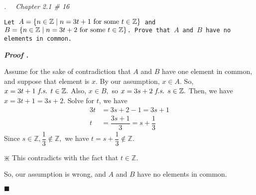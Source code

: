 \documentclass[11pt,letter]{article}
\newcounter{nq}[section]
\newcounter{np}[section]
\newenvironment*{p}{\par\noindent\textbf{\textit{Proof \stepcounter{np}\thenp. }}\par}{\par\hfill $\blacksquare$\par}
\newenvironment*{q}[1]{\noindent\emph{\thesection.\stepcounter{nq}\thenq$\quad $ #1}\par\noindent\texttt}{}
\def\Z{{\mathbb{Z}}}
\def\fs{\emph{ f.s. }}
\begin{document}
\begin{framed}\begin{q}
	{Chapter 2.1 \# 16}
	{Let $A=\qty{n\in\Z\mid n=3t+1\text{ for some }t\in\Z}$ and $B=\qty{n\in\Z\mid n=3t+2\text{ for some }t\in\Z}$. Prove that $A$ and $B$ have no elements in common.}
\end{q}\end{framed}
\begin{p}
	Assume for the sake of contradiction that $A$ and $B$ have one element in common, and suppose that element is $x$. By our assumption, $x\in A.$ So, $x=3t+1\fs t\in\Z.$ Also, $x\in B,$ so $x=3s+2\fs s\in\Z.$ Then, we have $x=3t+1=3s+2.$ Solve for $t$, we have \[\begin{aligned}3t&=3s+2-1=3s+1\\t&=\dfrac{3s+1}{3}=s+\dfrac{1}{3}\end{aligned}\] Since $s\in\Z,\dfrac{1}{3}\notin\Z,$ we have $t=s+\dfrac{1}{3}\notin\Z.$ \begin{center}$\divideontimes$ This contradicts with the fact that $t\in\Z.$\end{center} So, our assumption is wrong, and $A$ and $B$ have no elements in common.
\end{p}
\end{document}
